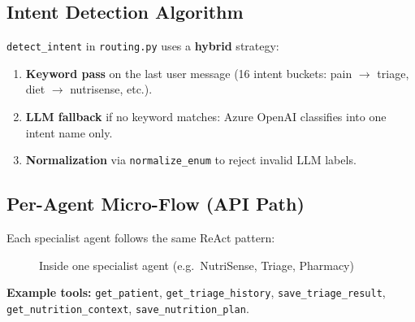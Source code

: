 \documentclass[12pt,a4paper]{article}
\begin{document}
\subsection{Intent Detection Algorithm}

\texttt{detect\_intent} in \texttt{routing.py} uses a \textbf{hybrid} strategy:

\begin{enumerate}[noitemsep]
    \item \textbf{Keyword pass} on the last user message (16 intent buckets: pain $\rightarrow$ triage, diet $\rightarrow$ nutrisense, etc.).
    \item \textbf{LLM fallback} if no keyword matches: Azure OpenAI classifies into one intent name only.
    \item \textbf{Normalization} via \texttt{normalize\_enum} to reject invalid LLM labels.
\end{enumerate}

\subsection{Per-Agent Micro-Flow (API Path)}

Each specialist agent follows the same ReAct pattern:

\begin{figure}[H]
\centering
{}
\caption{Inside one specialist agent (e.g.\ NutriSense, Triage, Pharmacy)}
\end{figure}

\textbf{Example tools:} \texttt{get\_patient}, \texttt{get\_triage\_history}, \texttt{save\_triage\_result}, \texttt{get\_nutrition\_context}, \texttt{save\_nutrition\_plan}.
\end{document}

